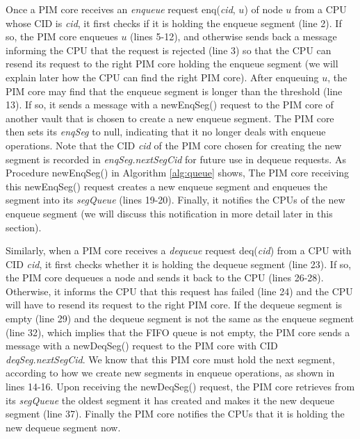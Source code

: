 Once a PIM core receives an \emph{enqueue} request enq(\textit{cid}, $u$) of node $u$ from a CPU whose CID is \textit{cid},
it first checks if it is holding the enqueue segment (line 2).
If so, the PIM core enqueues $u$ (lines 5-12), and otherwise sends back a message
informing the CPU that the request is rejected (line 3) so that
the CPU can resend its request to the right PIM core holding the enqueue segment
(we will explain later how the CPU can find the right PIM core).
After enqueuing $u$, the PIM core may find that the enqueue segment is longer than the threshold (line 13).
If so, it sends a message with a newEnqSeg() request to the PIM core of another vault that is chosen 
to create a new enqueue segment.
The PIM core then sets its \textit{enqSeg} to null, indicating that it no longer deals with enqueue operations.
Note that the CID \textit{cid} of the PIM core chosen for creating the new segment is recorded in 
\textit{enqSeg.nextSegCid} for future use in dequeue requests.
As Procedure newEnqSeg() in Algorithm \ref{alg:queue} shows,
The PIM core receiving this newEnqSeg() request creates a new enqueue segment and 
enqueues the segment into its \textit{segQueue} (lines 19-20).
Finally, it notifies the CPUs of the new enqueue segment 
(we will discuss this notification in more detail later in this section).

Similarly, when a PIM core receives a \emph{dequeue} request deq(\textit{cid}) from a CPU with CID \textit{cid},
it first checks whether it is holding the dequeue segment (line 23).
If so, the PIM core dequeues a node and sends it back to the CPU (lines 26-28).
Otherwise, it informs the CPU that this request has failed (line 24) and
the CPU will have to resend its request to the right PIM core.
If the dequeue segment is empty (line 29) and the dequeue segment is not the same as 
the enqueue segment (line 32), which implies that the FIFO queue is not empty, 
the PIM core sends a message with a newDeqSeg() request 
to the PIM core with CID \textit{deqSeg.nextSegCid}. 
We know that this PIM core must hold the next segment, 
according to how we create new segments in enqueue operations, 
as shown in lines 14-16. 
Upon receiving the newDeqSeg() request, 
the PIM core retrieves from its \textit{segQueue} the oldest segment it has created and 
makes it the new dequeue segment (line 37). 
Finally the PIM core notifies the CPUs that it is holding the new dequeue segment now.

